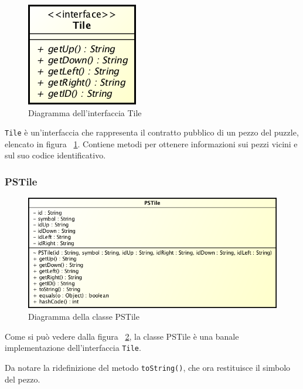 \documentclass[a4paper, 12pt]{article}
\begin{document}
        \begin{figure}[H]

          \centering
          \includegraphics[scale=0.7]{uml/tile.png}
          \caption{Diagramma dell'interfaccia Tile}
          \label{uml:tile}

        \end{figure}

        \verb|Tile| è un'interfaccia che rappresenta il contratto pubblico di un pezzo del puzzle, elencato in figura ~\ref{uml:tile}. Contiene metodi per ottenere informazioni sui pezzi vicini e sul suo codice identificativo.

      \subsubsection{PSTile}

        \begin{figure}[H]

          \centering
          \includegraphics[scale=0.7]{uml/pstile.png}
          \caption{Diagramma della classe PSTile}
          \label{uml:pstile}

        \end{figure}

        Come si può vedere dalla figura ~\ref{uml:pstile}, la classe PSTile è una banale implementazione dell'interfaccia \verb|Tile|. 

        Da notare la ridefinizione del metodo \verb|toString()|, che ora restituisce il simbolo del pezzo.
\end{document}
